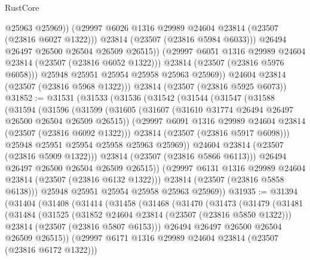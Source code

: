 \begin{lexlean}{RustCore}
\begin{coremodule}
                      @25963
                      @25969))
                  (@29997 @6026 @1316 @29989 @24604 @23814 (@23507 (@23816 @6027 @1322)))
                  @23814
                  (@23507 (@23816 @5984 @6033)))
                @26494
                @26497
                @26500
                @26504
                @26509
                @26515))
            (@29997 @6051 @1316 @29989 @24604 @23814 (@23507 (@23816 @6052 @1322)))
            @23814
            (@23507 (@23816 @5976 @6058)))
          @25948
          @25951
          @25954
          @25958
          @25963
          @25969))
      @24604
      @23814
      (@23507 (@23816 @5968 @1322)))
    @23814
    (@23507 (@23816 @5925 @6073))
@31852 := @31531
    (@31533
      (@31536
        (@31542
          (@31544
            (@31547
              (@31588
                (@31594
                  (@31596
                    (@31599
                      (@31605
                        (@31607 (@31610 @31774 @26494 @26497 @26500 @26504 @26509 @26515))
                        (@29997 @6091 @1316 @29989 @24604 @23814 (@23507 (@23816 @6092 @1322)))
                        @23814
                        (@23507 (@23816 @5917 @6098)))
                      @25948
                      @25951
                      @25954
                      @25958
                      @25963
                      @25969))
                  @24604
                  @23814
                  (@23507 (@23816 @5909 @1322)))
                @23814
                (@23507 (@23816 @5866 @6113)))
              @26494
              @26497
              @26500
              @26504
              @26509
              @26515))
          (@29997 @6131 @1316 @29989 @24604 @23814 (@23507 (@23816 @6132 @1322)))
          @23814
          (@23507 (@23816 @5858 @6138)))
        @25948
        @25951
        @25954
        @25958
        @25963
        @25969))
@31935 := @31394
    (@31404
      (@31408
        (@31414
          (@31458
            (@31468
              (@31470
                (@31473
                  (@31479
                    (@31481
                      (@31484
                        (@31525
                          (@31852 @24604 @23814 (@23507 (@23816 @5850 @1322)))
                          @23814
                          (@23507 (@23816 @5807 @6153)))
                        @26494
                        @26497
                        @26500
                        @26504
                        @26509
                        @26515))
                    (@29997 @6171 @1316 @29989 @24604 @23814 (@23507 (@23816 @6172 @1322)))

\end{coremodule}
\end{lexlean}
